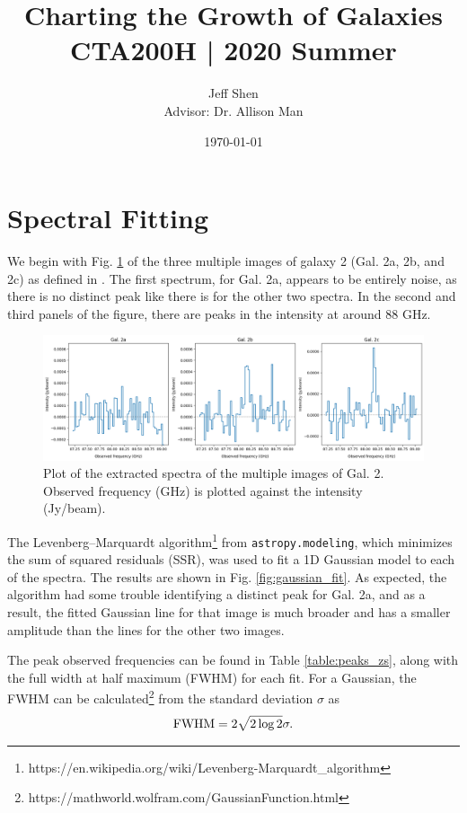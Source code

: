 \documentclass[11pt]{article}
\newcommand{\code}{\texttt}
\begin{document}
\title{\textbf{Charting the Growth of Galaxies} \\[0.25cm] \large{CTA200H | 2020 Summer}}
\author{Jeff Shen \\ Advisor: Dr. Allison Man}
\date{\today}
\maketitle

\section*{Spectral Fitting}

We begin with Fig. \ref{fig:initial_spectra} of the three multiple images of galaxy 2 (Gal. 2a, 2b, and 2c) as defined in \cite{MacKenzie2014}. The first spectrum, for Gal. 2a, appears to be entirely noise, as there is no distinct peak like there is for the other two spectra. In the second and third panels of the figure, there are peaks in the intensity at around 88 GHz. 

\begin{figure}[!htbp]
    \centering
    \includegraphics[width=\linewidth]{../figs/initial_spectra.png}
	\caption{Plot of the extracted spectra of the multiple images of Gal. 2. Observed frequency (GHz) is plotted against the intensity (Jy/beam).}
    \label{fig:initial_spectra}
\end{figure}

The Levenberg–Marquardt algorithm\footnote{https://en.wikipedia.org/wiki/Levenberg-Marquardt\_algorithm} from \code{astropy.modeling}, which minimizes the sum of squared residuals (SSR), was used to fit a 1D Gaussian model to each of the spectra. The results are shown in Fig. \ref{fig:gaussian_fit}. As expected, the algorithm had some trouble identifying a distinct peak for Gal. 2a, and as a result, the fitted Gaussian line for that image is much broader and has a smaller amplitude than the lines for the other two images.

The peak observed frequencies can be found in Table \ref{table:peaks_zs}, along with the full width at half maximum (FWHM) for each fit. For a Gaussian, the FWHM can be calculated\footnote{https://mathworld.wolfram.com/GaussianFunction.html} from the standard deviation $\sigma$ as 
\begin{align*}
	\rm{FWHM} = 2\sqrt{2\log{2}}\sigma.
\end{align*}
\end{document}
